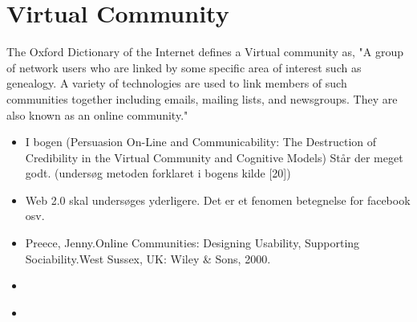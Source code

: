 \chapter{Virtual Community}
\label{VirtualCommunity}

The Oxford Dictionary of the Internet defines a Virtual community as, "A group of network users who are linked by some specific area of interest such as genealogy. A variety of technologies are used to link members of such communities together including emails, mailing lists, and newsgroups. They are also known as an online community."

\begin{itemize}
  \item I bogen (Persuasion On-Line and Communicability: The Destruction of Credibility in the Virtual Community and Cognitive Models) Står der meget godt. (undersøg metoden forklaret i bogens kilde [20])
  \item Web 2.0 skal undersøges yderligere. Det er et fenomen betegnelse for facebook osv.
  \item Preece, Jenny.Online Communities: Designing Usability, Supporting Sociability.West Sussex, UK: Wiley & Sons, 2000.
  \item 
  \item 
\end{itemize}
